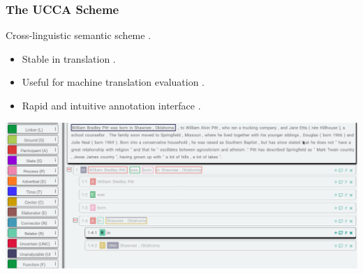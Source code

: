 \documentclass[t]{beamer}
\begin{document}
\begin{frame}
\frametitle{The UCCA Scheme}
Cross-linguistic semantic scheme \cite{abend2013universal}.
\begin{itemize}
\item Stable in translation \cite{sulem2015conceptual}.
\item Useful for machine translation evaluation \cite{birch2016hume}.
\item Rapid and intuitive annotation interface \cite{abend2017uccaapp}.
\end{itemize}
\vfill
\begin{adjustbox}{center}
  \includegraphics[width=\pagewidth]{uccaapp.png}
\end{adjustbox}
\end{frame}
\end{document}
